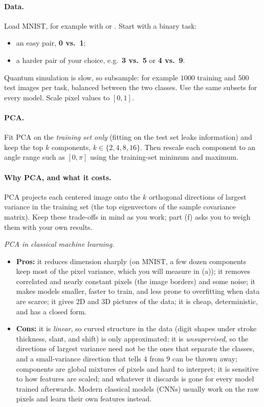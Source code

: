 \documentclass[11pt]{article}
\begin{document}
\paragraph{Data.}
Load MNIST, for example with  or . Start with a binary task:
\begin{itemize}
\item an easy pair, \textbf{0 vs.\ 1};
\item a harder pair of your choice, e.g.\ \textbf{3 vs.\ 5} or \textbf{4 vs.\ 9}.
\end{itemize}
Quantum simulation is slow, so subsample: for example $1000$ training and $500$ test images per task, balanced between the two classes. Use the same subsets for every model. Scale pixel values to $[0,1]$.

\paragraph{PCA.}
Fit PCA on the \emph{training set only} (fitting on the test set leaks information) and keep the top $k$ components, $k\in\{2,4,8,16\}$. Then rescale each component to an angle range such as $[0,\pi]$ using the training-set minimum and maximum.

\paragraph{Why PCA, and what it costs.}
PCA projects each centered image onto the $k$ orthogonal directions of largest variance in the training set (the top eigenvectors of the sample covariance matrix). Keep these trade-offs in mind as you work; part (f) asks you to weigh them with your own results.

\smallskip
\noindent\emph{PCA in classical machine learning.}
\begin{itemize}
\item \textbf{Pros:} it reduces dimension sharply (on MNIST, a few dozen components keep most of the pixel variance, which you will measure in (a)); it removes correlated and nearly constant pixels (the image borders) and some noise; it makes models smaller, faster to train, and less prone to overfitting when data are scarce; it gives 2D and 3D pictures of the data; it is cheap, deterministic, and has a closed form.
\item \textbf{Cons:} it is \emph{linear}, so curved structure in the data (digit shapes under stroke thickness, slant, and shift) is only approximated; it is \emph{unsupervised}, so the directions of largest variance need not be the ones that separate the classes, and a small-variance direction that tells 4 from 9 can be thrown away; components are global mixtures of pixels and hard to interpret; it is sensitive to how features are scaled; and whatever it discards is gone for every model trained afterwards. Modern classical models (CNNs) usually work on the raw pixels and learn their own features instead.
\end{itemize}
\end{document}
